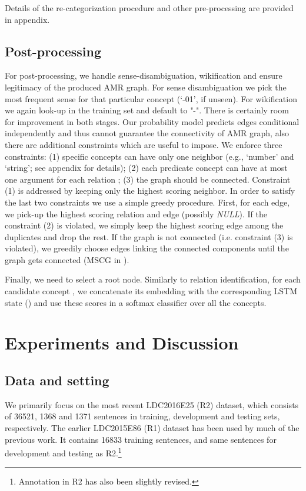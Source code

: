 \documentclass[11pt,a4paper]{article}
\begin{document}
Details of the re-categorization procedure and other pre-processing are provided in appendix. 




\nocite{Pourdamghani2014AligningES,pennington2014glove,manning-EtAl:2014:P14-5}

\subsection{Post-processing}\label{sec:post}
For post-processing, we handle sense-disambiguation, wikification and ensure legitimacy of the produced AMR graph.
For sense disambiguation we pick the most frequent sense for that particular concept (`-01', if unseen). For wikification we again look-up in the training set and default to "-". There is certainly room for improvement in both stages.
Our probability model predicts edges conditional independently and thus cannot guarantee the connectivity of AMR graph, also there are additional constraints which are useful to impose.
We enforce three constraints: (1) specific concepts can have only one neighbor (e.g., `number' and `string'; see appendix for details); (2) each predicate concept can have at most one argument for each relation ; (3) the graph should be connected.
Constraint (1) is addressed by keeping only the highest scoring neighbor. In order to satisfy the last two constraints we use a simple greedy procedure. First, for each edge, we pick-up the highest scoring relation and edge (possibly {\it NULL}).  If the constraint (2) is violated, we simply keep the highest scoring edge among the duplicates and drop the rest. If the graph is not connected (i.e. constraint (3) is violated), we greedily choose edges linking the connected components until the graph gets connected (MSCG in ).


Finally, we need to select a root node. Similarly to relation identification,  for each candidate concept , we  concatenate its embedding with the corresponding LSTM state () and use these scores in a softmax classifier over all the concepts.

\section{Experiments and Discussion}

\subsection{Data and setting}
\label{sect:setting}
We  primarily focus on the most recent LDC2016E25 (R2) dataset, which consists of 36521, 1368 and 1371 sentences in training, development and testing sets, respectively. The earlier LDC2015E86 (R1) dataset has been used by much of the previous work. It contains 16833 training sentences, and same sentences for development and testing as R2.\footnote{Annotation in R2 has also been slightly revised.} 
\end{document}
